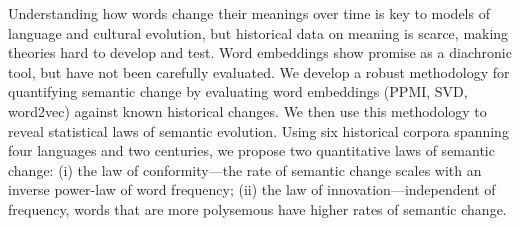 Understanding how words change their meanings over time is key to models of language and cultural evolution, but historical data on meaning is scarce, making theories hard to develop and test. Word embeddings show promise as a diachronic tool, but have not been carefully evaluated. We develop a robust methodology for quantifying semantic change by evaluating word embeddings (PPMI, SVD, word2vec) against known historical changes. We then use this methodology to reveal statistical laws of semantic evolution. Using six historical corpora spanning four languages and two centuries, we propose two quantitative laws of semantic change: (i) the law of conformity---the rate of semantic change scales with an inverse power-law of word frequency; (ii) the law of innovation---independent of frequency, words that are more polysemous have higher rates of semantic change.
